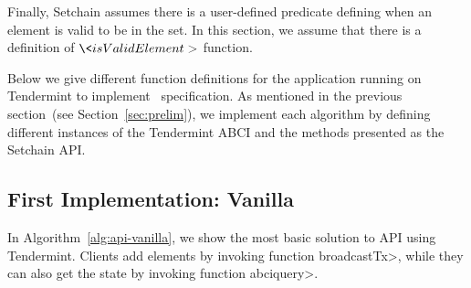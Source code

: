 
Finally, Setchain assumes there is a user-defined predicate defining when an
element is valid to be in the set.
%
In this section, we assume that there is a definition of \(\<isValidElement>\)
function.

%
%
%

Below we give different function definitions for the application running on
Tendermint to implement \setchain\ specification.
%
As mentioned in the previous section~(see Section~\ref{sec:prelim}), we
implement each algorithm by defining different instances of the Tendermint ABCI
and the methods presented as the Setchain API.

\subsection{First Implementation: Vanilla}\label{subsec:vanilla}



In Algorithm~\ref{alg:api-vanilla}, we show the most basic solution to \setchain API
using Tendermint.
%
Clients add elements by
invoking function \<broadcastTx>,
%
while they can also get the \setchain state by invoking function
\<abciquery>.
%

